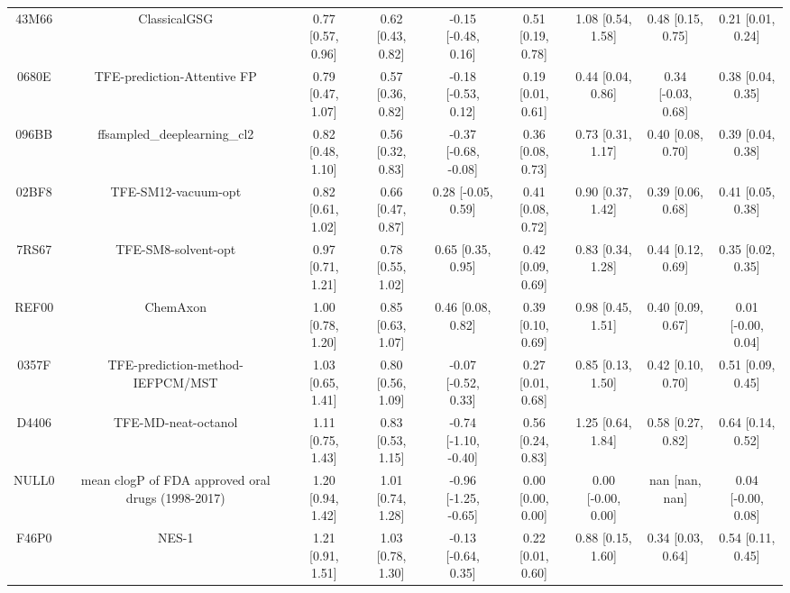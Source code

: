 \documentclass{article}
\begin{document}
\begin{center}
\begin{longtable}{|ccccccccc|}
 43M66 &                                       ClassicalGSG &  0.77 [0.57, 0.96] &  0.62 [0.43, 0.82] &   -0.15 [-0.48, 0.16] &  0.51 [0.19, 0.78] &     1.08 [0.54, 1.58] &     0.48 [0.15, 0.75] &     0.21 [0.01, 0.24] \\
 0680E &                        TFE-prediction-Attentive FP &  0.79 [0.47, 1.07] &  0.57 [0.36, 0.82] &   -0.18 [-0.53, 0.12] &  0.19 [0.01, 0.61] &     0.44 [0.04, 0.86] &    0.34 [-0.03, 0.68] &     0.38 [0.04, 0.35] \\
 096BB &                       ffsampled\_deeplearning\_cl2 &  0.82 [0.48, 1.10] &  0.56 [0.32, 0.83] &  -0.37 [-0.68, -0.08] &  0.36 [0.08, 0.73] &     0.73 [0.31, 1.17] &     0.40 [0.08, 0.70] &     0.39 [0.04, 0.38] \\
 02BF8 &                                TFE-SM12-vacuum-opt &  0.82 [0.61, 1.02] &  0.66 [0.47, 0.87] &    0.28 [-0.05, 0.59] &  0.41 [0.08, 0.72] &     0.90 [0.37, 1.42] &     0.39 [0.06, 0.68] &     0.41 [0.05, 0.38] \\
 7RS67 &                                TFE-SM8-solvent-opt &  0.97 [0.71, 1.21] &  0.78 [0.55, 1.02] &     0.65 [0.35, 0.95] &  0.42 [0.09, 0.69] &     0.83 [0.34, 1.28] &     0.44 [0.12, 0.69] &     0.35 [0.02, 0.35] \\
 REF00 &                                           ChemAxon &  1.00 [0.78, 1.20] &  0.85 [0.63, 1.07] &     0.46 [0.08, 0.82] &  0.39 [0.10, 0.69] &     0.98 [0.45, 1.51] &     0.40 [0.09, 0.67] &    0.01 [-0.00, 0.04] \\
 0357F &                   TFE-prediction-method-IEFPCM/MST &  1.03 [0.65, 1.41] &  0.80 [0.56, 1.09] &   -0.07 [-0.52, 0.33] &  0.27 [0.01, 0.68] &     0.85 [0.13, 1.50] &     0.42 [0.10, 0.70] &     0.51 [0.09, 0.45] \\
 D4406 &                                TFE-MD-neat-octanol &  1.11 [0.75, 1.43] &  0.83 [0.53, 1.15] &  -0.74 [-1.10, -0.40] &  0.56 [0.24, 0.83] &     1.25 [0.64, 1.84] &     0.58 [0.27, 0.82] &     0.64 [0.14, 0.52] \\
 NULL0 &  mean clogP of FDA approved oral drugs (1998-2017) &  1.20 [0.94, 1.42] &  1.01 [0.74, 1.28] &  -0.96 [-1.25, -0.65] &  0.00 [0.00, 0.00] &    0.00 [-0.00, 0.00] &        nan [nan, nan] &    0.04 [-0.00, 0.08] \\
 F46P0 &                                              NES-1 &  1.21 [0.91, 1.51] &  1.03 [0.78, 1.30] &   -0.13 [-0.64, 0.35] &  0.22 [0.01, 0.60] &     0.88 [0.15, 1.60] &     0.34 [0.03, 0.64] &     0.54 [0.11, 0.45] \\

\end{longtable}
\end{center}
\end{document}
